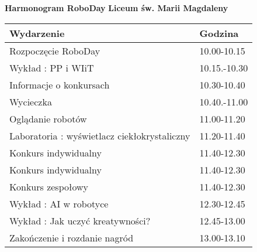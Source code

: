 \documentclass{article}
\begin{document}
\begin{center}
\Large\textbf{Harmonogram RoboDay}
\large\textbf{Liceum św. Marii Magdaleny}
\end{center}
\vspace{1cm}
\begin{center}
\begin{tabular}{|l|l|}
\hline
\textbf{Wydarzenie} & \textbf{Godzina} \\
\hline
Rozpoczęcie RoboDay & 10.00-10.15 \\
\hline
Wykład : PP i WIiT & 10.15.-10.30 \\
\hline
Informacje o konkursach & 10.30-10.40 \\
\hline
Wycieczka & 10.40.-11.00 \\
\hline
Oglądanie robotów & 11.00-11.20 \\
\hline
Laboratoria : wyświetlacz ciekłokrystaliczny & 11.20-11.40 \\
\hline
Konkurs indywidualny & 11.40-12.30 \\
\hline
Konkurs indywidualny & 11.40-12.30 \\
\hline
Konkurs zespołowy & 11.40-12.30 \\
\hline
Wykład : AI w robotyce & 12.30-12.45 \\
\hline
Wykład : Jak uczyć kreatywności? & 12.45-13.00 \\
\hline
Zakończenie i rozdanie nagród & 13.00-13.10 \\
\hline
\end{tabular}
\end{center}
\end{document}
